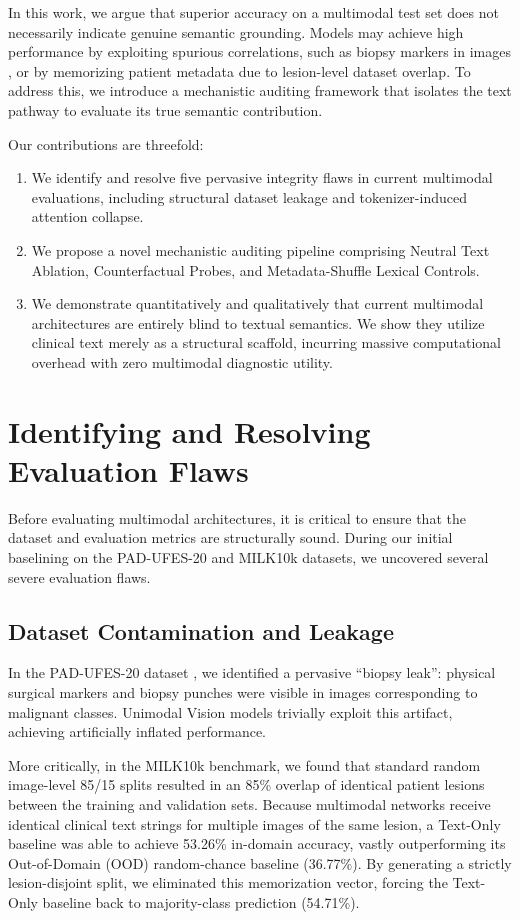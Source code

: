 \documentclass[runningheads]{llncs}
\begin{document}
In this work, we argue that superior accuracy on a multimodal test set does not necessarily indicate genuine semantic grounding. Models may achieve high performance by exploiting spurious correlations, such as biopsy markers in images \cite{pacheco2020pad}, or by memorizing patient metadata due to lesion-level dataset overlap. To address this, we introduce a mechanistic auditing framework that isolates the text pathway to evaluate its true semantic contribution.

Our contributions are threefold:
\begin{enumerate}
    \item We identify and resolve five pervasive integrity flaws in current multimodal evaluations, including structural dataset leakage and tokenizer-induced attention collapse.
    \item We propose a novel mechanistic auditing pipeline comprising Neutral Text Ablation, Counterfactual Probes, and Metadata-Shuffle Lexical Controls.
    \item We demonstrate quantitatively and qualitatively that current multimodal architectures are entirely blind to textual semantics. We show they utilize clinical text merely as a structural scaffold, incurring massive computational overhead with zero multimodal diagnostic utility.
\end{enumerate}

\section{Identifying and Resolving Evaluation Flaws}

Before evaluating multimodal architectures, it is critical to ensure that the dataset and evaluation metrics are structurally sound. During our initial baselining on the PAD-UFES-20 and MILK10k datasets, we uncovered several severe evaluation flaws.

\subsection{Dataset Contamination and Leakage}
In the PAD-UFES-20 dataset \cite{pacheco2020pad}, we identified a pervasive ``biopsy leak'': physical surgical markers and biopsy punches were visible in images corresponding to malignant classes. Unimodal Vision models trivially exploit this artifact, achieving artificially inflated performance. 

More critically, in the MILK10k benchmark, we found that standard random image-level 85/15 splits resulted in an 85\% overlap of identical patient lesions between the training and validation sets. Because multimodal networks receive identical clinical text strings for multiple images of the same lesion, a Text-Only baseline was able to achieve 53.26\% in-domain accuracy, vastly outperforming its Out-of-Domain (OOD) random-chance baseline (36.77\%). By generating a strictly lesion-disjoint split, we eliminated this memorization vector, forcing the Text-Only baseline back to majority-class prediction (54.71\%).
\end{document}
